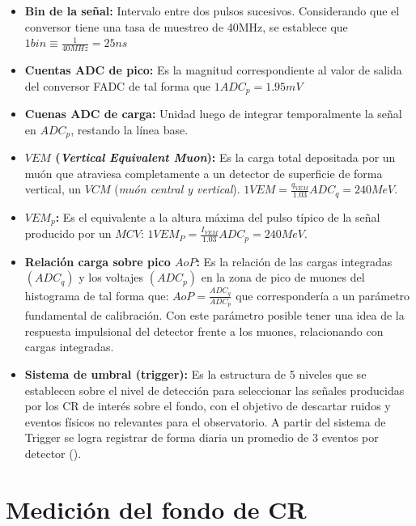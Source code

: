 \begin{itemize}
\item     \textbf{Bin de la señal:} Intervalo entre dos pulsos sucesivos. Considerando que el conversor tiene una tasa de muestreo de 40MHz, se establece que $1bin\equiv \frac{1}{40MHz} = 25ns$
    \item \textbf{Cuentas ADC de pico:} Es la magnitud correspondiente al valor de salida del conversor FADC de tal forma que $1ADC_{p}= 1.95mV$ 
    \item \textbf{Cuenas ADC de carga:} Unidad luego de integrar temporalmente la señal en $ADC_{p}$, restando la línea base.
    \item \textbf{$VEM$ (\textit{Vertical Equivalent Muon}):} Es la carga total depositada por un muón que atraviesa completamente a un detector de superficie de forma vertical, un $VCM$ (\textit{muón central y vertical}). $1VEM=\frac{q_{VEM}}{1.03}ADC_{q}=240MeV$.
    \item \textbf{$VEM_{p}$:} Es el equivalente a la altura máxima del pulso típico de la señal producido por un $MCV$: $1VEM_{P}=\frac{I_{VEM}}{1.03}ADC_{p}=240MeV$.
    \item \textbf{Relación carga sobre pico $AoP$: } Es la relación de las cargas integradas $(ADC_{q})$ y los voltajes $(ADC_{p})$ en la zona de pico de muones del histograma de tal forma que: $AoP=\frac{ADC_{q}}{ADC_{p}}$ que correspondería a un parámetro fundamental de calibración. Con este parámetro posible tener una idea de la respuesta impulsional del detector frente a los muones, relacionando con cargas integradas.
    \item \textbf{Sistema de umbral (trigger):} Es la estructura de 5 niveles que se establecen sobre el nivel de detección para seleccionar las señales producidas por los CR de interés sobre el fondo, con el objetivo de descartar ruidos y eventos físicos no relevantes para el observatorio. A partir del sistema de Trigger se logra registrar de forma diaria un promedio de 3 eventos por detector (\cite{asorey_2012}).
\end{itemize}

\section{Medición del fondo de CR}


